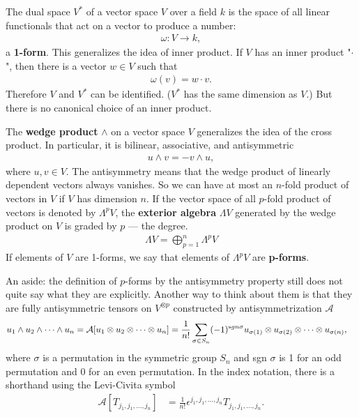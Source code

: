 \documentclass[aps,nofootinbib]{revtex4}
\begin{document}
The dual space $V^*$ of a vector space $V$ over a field $k$ is the space of all linear functionals that act on a vector to produce a number:
\begin{align*}
\omega: V \to k,
\end{align*}
a {\bf 1-form}. This generalizes the idea of inner product. If $V$ has an inner product "$\cdot$", then there is a vector $w \in V$ such that
\begin{align*}
\omega (v) = w \cdot v.
\end{align*}
Therefore $V$ and $V^*$ can be identified. ($V^*$ has the same dimension as $V$.) But there is no canonical choice of an inner product.

The {\bf wedge product} $\wedge$ on a vector space $V$ generalizes the idea of the cross product. In particular, it is bilinear, associative, and antisymmetric
\begin{align}
u \wedge v = - v \wedge u,
\end{align}
where $u,v \in V$. The antisymmetry means that the wedge product of linearly dependent vectors always vanishes. So we can have at most an $n$-fold product of vectors in $V$ if $V$ has dimension $n$. If the vector space of all $p$-fold product of vectors is denoted by $\Lambda^p V$, the {\bf exterior algebra} $\Lambda V$ generated by the wedge product on $V$ is graded by $p$ --- the degree.
\begin{align*}
\Lambda V = \bigoplus_{p=1}^n \Lambda^p V
\end{align*}
If elements of $V$ are 1-forms, we say that elements of $\Lambda^p V$ are {\bf p-forms}.

An aside: the definition of $p$-forms by the antisymmetry property still does not quite say what they are explicitly. Another way to think about them is that they are fully antisymmetric tensors on $V^{\otimes p}$ constructed by antisymmetrization $\mathcal{A}$
\begin{align}
u_1 \wedge u_2 \wedge \cdots \wedge u_n = \mathcal{A} [u_1 \otimes u_2 \otimes \cdots \otimes u_n] 	
	&= \frac{1}{n!} \sum_{\sigma \in S_n} (-1)^{{\text sgn} \sigma} u_{\sigma(1)} \otimes u_{\sigma(2)} \otimes \cdots \otimes u_{\sigma(n)},
\end{align}
where $\sigma$ is a permutation in the symmetric group $S_n$ and sgn $\sigma$ is 1 for an odd permutation and 0 for an even permutation. In the index notation, there is a shorthand using the Levi-Civita symbol
\begin{align}
\mathcal{A} \left[ T_{j_1,j_1,\dots,j_n} \right] &= \frac{1}{n!} \epsilon^{j_1,j_1,\dots,j_n} T_{j_1,j_1,\dots,j_n}.
\end{align}
\end{document}

